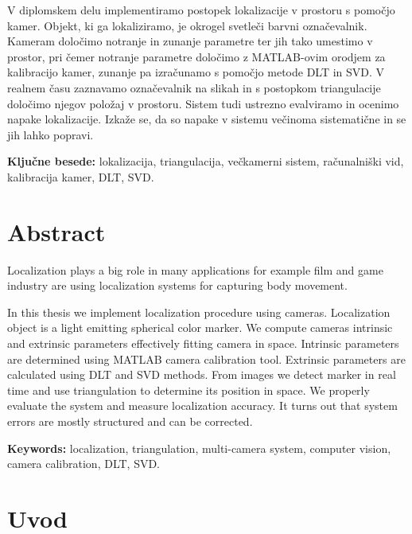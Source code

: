 \documentclass[a4paper, 12pt]{book}
\newcommand{\tkeywords}{lokalizacija, triangulacija, večkamerni sistem, računalniški vid, kalibracija kamer, DLT, SVD}
\newcommand{\tkeywordsEn}{localization, triangulation, multi-camera system, computer vision, camera calibration, DLT, SVD}
\newcommand{\clearemptydoublepage}{\newpage{\pagestyle{empty}\cleardoublepage}}
\begin{document}
V diplomskem delu implementiramo postopek lokalizacije v prostoru s pomočjo kamer. Objekt, ki ga lokaliziramo, je okrogel svetleči barvni označevalnik. Kameram določimo notranje in zunanje parametre ter jih tako umestimo v prostor, pri čemer notranje parametre določimo z MATLAB-ovim orodjem za kalibracijo kamer, zunanje pa izračunamo s pomočjo metode DLT in SVD. V realnem času zaznavamo označevalnik na slikah in s postopkom triangulacije določimo njegov položaj v prostoru. Sistem tudi ustrezno evalviramo in ocenimo napake lokalizacije. Izkaže se, da so napake v sistemu večinoma sistematične in se jih lahko popravi.
\bigskip

\noindent\textbf{Ključne besede:} \tkeywords.
\clearemptydoublepage

\chapter*{Abstract}
Localization plays a big role in many applications for example film and game industry are using localization systems for capturing body movement.

In this thesis we implement localization procedure using cameras. Localization object is a light emitting spherical color marker. We compute cameras intrinsic and extrinsic parameters effectively fitting camera in space. Intrinsic parameters are determined using MATLAB camera calibration tool. Extrinsic parameters are calculated using DLT and SVD methods. From images we detect marker in real time and use triangulation to determine its position in space. We properly evaluate the system and measure localization accuracy. It turns out that system errors are mostly structured and can be corrected.
\bigskip

\noindent\textbf{Keywords:} \tkeywordsEn.
\clearemptydoublepage

\mainmatter
\setcounter{page}{1}
\pagestyle{fancy}

\chapter{Uvod}
\end{document}
